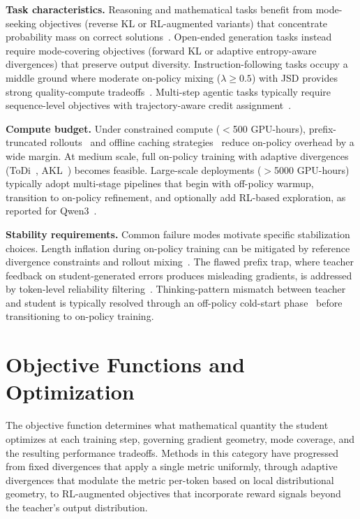 \documentclass{article} %
\begin{document}
\textbf{Task characteristics.} Reasoning and mathematical tasks benefit from mode-seeking objectives (reverse KL or RL-augmented variants) that concentrate probability mass on correct solutions~\citep{2306.08543,2602.12125,2506.02208}. Open-ended generation tasks instead require mode-covering objectives (forward KL or adaptive entropy-aware divergences) that preserve output diversity. Instruction-following tasks occupy a middle ground where moderate on-policy mixing ($\lambda \geq 0.5$) with JSD provides strong quality-compute tradeoffs~\citep{2306.13649}. Multi-step agentic tasks typically require sequence-level objectives with trajectory-aware credit assignment~\citep{2509.14257,2602.22495}.

\textbf{Compute budget.} Under constrained compute ($<$500 GPU-hours), prefix-truncated rollouts~\citep{2602.15260} and offline caching strategies~\citep{2604.13010} reduce on-policy overhead by a wide margin. At medium scale, full on-policy training with adaptive divergences (ToDi~\citep{2505.16297}, AKL~\citep{2404.02657}) becomes feasible. Large-scale deployments ($>$5000 GPU-hours) typically adopt multi-stage pipelines that begin with off-policy warmup, transition to on-policy refinement, and optionally add RL-based exploration, as reported for Qwen3~\citep{2505.09388}.

\textbf{Stability requirements.} Common failure modes motivate specific stabilization choices. Length inflation during on-policy training can be mitigated by reference divergence constraints and rollout mixing~\citep{2604.08527}. The flawed prefix trap, where teacher feedback on student-generated errors produces misleading gradients, is addressed by token-level reliability filtering~\citep{2604.14084,2604.10688}. Thinking-pattern mismatch between teacher and student is typically resolved through an off-policy cold-start phase~\citep{2604.13016} before transitioning to on-policy training.

\section{Objective Functions and Optimization}
\label{sec:objectives}

The objective function determines what mathematical quantity the student optimizes at each training step, governing gradient geometry, mode coverage, and the resulting performance tradeoffs. Methods in this category have progressed from fixed divergences that apply a single metric uniformly, through adaptive divergences that modulate the metric per-token based on local distributional geometry, to RL-augmented objectives that incorporate reward signals beyond the teacher's output distribution.
\end{document}
